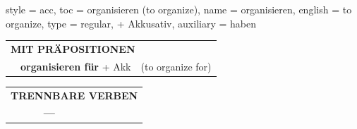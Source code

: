 \begin{verbentry}{
  style = {acc},
  toc = {organisieren (to organize)},
  name = {organisieren},
  english = {to organize},
  type = {regular, + Akkusativ},
  auxiliary = {haben}
}
\vspace{10pt}

\begin{tabular}{lll}
\multicolumn{3}{l}{\textbf{MIT PRÄPOSITIONEN}}\\
& \textbf{organisieren für} + Akk & (to organize for)\\
\end{tabular}
\hfill
\begin{tabular}{lll}
\multicolumn{3}{l}{\textbf{TRENNBARE VERBEN}}\\
& \textbf{---} & \\
\end{tabular}

\vspace{-5pt}
\end{verbentry}
